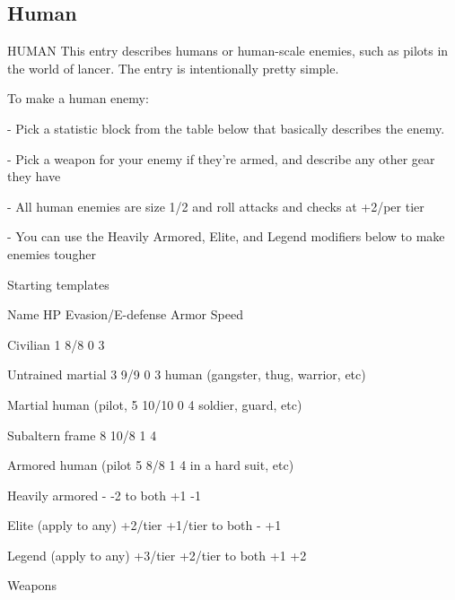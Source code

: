 \subsection{Human}
                                                HUMAN  
This entry describes humans or human-scale enemies, such as pilots in the world of lancer. The  
entry is intentionally pretty simple.
 

To make a human enemy:
 
            -   Pick a statistic block from the table below that basically describes the enemy. 
 
            -   Pick a weapon for your enemy if they’re armed, and describe any other gear they  
                have
 
            -   All human enemies are size 1/2 and roll attacks and checks at +2/per tier
 
            -   You can use the Heavily Armored, Elite, and Legend modifiers below to make  
                enemies tougher
 

                                           Starting templates  

 Name                        HP         Evasion/E-defense            Armor                   Speed 

 Civilian                    1          8/8                          0                       3 

 Untrained martial           3          9/9                          0                       3 
 human (gangster, thug,  
 warrior, etc) 

 Martial human (pilot,       5          10/10                        0                       4 
 soldier, guard, etc) 

 Subaltern frame             8          10/8                         1                       4 

 Armored human (pilot        5          8/8                          1                       4 
 in a hard suit, etc) 

 Heavily armored             -          -2 to both                   +1                      -1 

 Elite (apply to any)        +2/tier    +1/tier to both              -                       +1 

 Legend (apply to any)       +3/tier    +2/tier to both              +1                      +2 

                                                Weapons  

